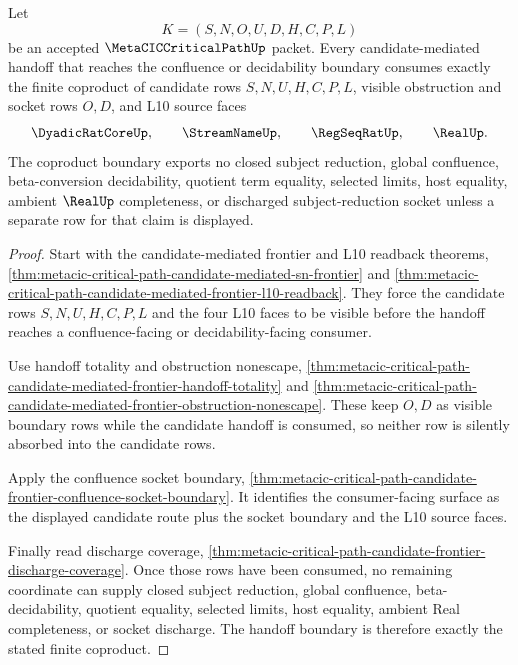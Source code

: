 \begin{theorem}
\label{thm:metacic-critical-path-candidate-frontier-discharge-socket-coproduct}
Let
$$
K=(S,N,O,U,D,H,C,P,L)
$$
be an accepted $\MetaCICCriticalPathUp$ packet. Every candidate-mediated handoff that reaches the confluence or decidability boundary consumes exactly the finite coproduct of candidate rows $S,N,U,H,C,P,L$, visible obstruction and socket rows $O,D$, and L10 source faces
$$
\DyadicRatCoreUp,\qquad
\StreamNameUp,\qquad
\RegSeqRatUp,\qquad
\RealUp .
$$
The coproduct boundary exports no closed subject reduction, global confluence, beta-conversion decidability, quotient term equality, selected limits, host equality, ambient $\RealUp$ completeness, or discharged subject-reduction socket unless a separate row for that claim is displayed.
\end{theorem}
\begin{proof}
Start with the candidate-mediated frontier and L10 readback theorems, \autoref{thm:metacic-critical-path-candidate-mediated-sn-frontier} and \autoref{thm:metacic-critical-path-candidate-mediated-frontier-l10-readback}. They force the candidate rows $S,N,U,H,C,P,L$ and the four L10 faces to be visible before the handoff reaches a confluence-facing or decidability-facing consumer.

Use handoff totality and obstruction nonescape, \autoref{thm:metacic-critical-path-candidate-mediated-frontier-handoff-totality} and \autoref{thm:metacic-critical-path-candidate-mediated-frontier-obstruction-nonescape}. These keep $O,D$ as visible boundary rows while the candidate handoff is consumed, so neither row is silently absorbed into the candidate rows.

Apply the confluence socket boundary, \autoref{thm:metacic-critical-path-candidate-frontier-confluence-socket-boundary}. It identifies the consumer-facing surface as the displayed candidate route plus the socket boundary and the L10 source faces.

Finally read discharge coverage, \autoref{thm:metacic-critical-path-candidate-frontier-discharge-coverage}. Once those rows have been consumed, no remaining coordinate can supply closed subject reduction, global confluence, beta-decidability, quotient equality, selected limits, host equality, ambient Real completeness, or socket discharge. The handoff boundary is therefore exactly the stated finite coproduct.
\end{proof}

